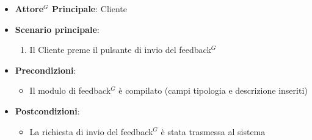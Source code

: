 \label{uc_23.3}
\begin{itemize}
    \item \textbf{Attore$^G$ Principale}: Cliente
	\item \textbf{Scenario principale}:
	\begin{enumerate}
		\item Il Cliente preme il pulsante di invio del feedback$^G$
	\end{enumerate}
	\item \textbf{Precondizioni}:
	\begin{itemize}
		\item Il modulo di feedback$^G$ è compilato (campi tipologia e descrizione inseriti)
	\end{itemize}
	\item \textbf{Postcondizioni}:
	\begin{itemize}
		\item La richiesta di invio del feedback$^G$ è stata trasmessa al sistema
	\end{itemize}
\end{itemize}